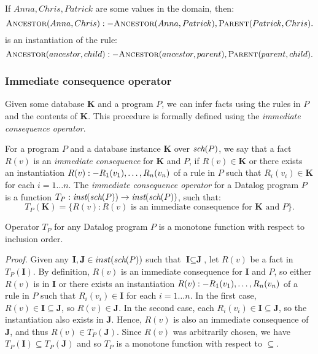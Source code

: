 \begin{exmp}
If $Anna, Chris, Patrick$ are some values in the domain, then:
$$\textsc{Ancestor}(Anna, Chris) :- \textsc{Ancestor} (Anna, Patrick), \textsc{Parent} (Patrick, Chris).$$
is an instantiation of the rule: 
$$\textsc{Ancestor} (ancestor, child) :- \textsc{Ancestor} (ancestor, parent), \textsc{Parent} (parent, child).$$
\end{exmp}

\subsubsection{Immediate consequence operator}
Given some database $\textbf{K}$ and a program $P$, we can infer facts using the rules in $P$ and the contents of $\textbf{K}$. This procedure is formally defined using the \emph{immediate consequence operator}.

\begin{defn}

For a program $P$ and a database instance $\textbf{K}$ over $\textit{sch}(P)$, we say that a fact $R(v)$ is an \emph{immediate consequence} for $\textbf{K}$ and $P$, if $R(v) \in \textbf{K}$ or there exists an instantiation $R(v) :- R_1(v_1), \dots, R_n(v_n)$ of a rule in $P$ such that $R_i(v_i) \in \textbf{K}$ for each $i = 1\dots n$. The \emph{immediate consequence operator} for a Datalog program $P$ is a function $T_P: \textit{inst}(\textit{sch}(P)) \to \textit{inst}(\textit{sch}(P))$, such that:
$$T_P(\textbf{K}) = \{ R(v): R(v) \text{ is an immediate consequence for } \textbf{K} \text{ and } P \}.$$

\end{defn}

\begin{lem}
Operator $T_P$ for any Datalog program $P$ is a monotone function with respect to inclusion order.
\end{lem}
\emph{Proof.} Given any $\textbf{I}, \textbf{J} \in inst(\textit{sch}(P))$ such that $\textbf{I} \subseteq \textbf{J}$, let $R(v)$ be a fact in $T_P(\textbf{I})$.
By definition, $R(v)$ is an immediate consequence for $\textbf{I}$ and $P$, so either $R(v)$ is in $\textbf{I}$ or there exists an instantiation
 $R(v) :- R_1(v_1), \dots, R_n(v_n)$ of a rule in $P$ such that $R_i(v_i) \in \textbf{I}$ for each $i = 1\dots n$. 
In the first case, $R(v) \in \textbf{I} \subseteq \textbf{J}$, so $R(v) \in \textbf{J}$. 
In the second case, each $R_i(v_i) \in \textbf{I} \subseteq \textbf{J}$, so the instantiation also exists in $\textbf{J}$. 
Hence, $R(v)$ is also an immediate consequence of $\textbf{J}$, and thus $R(v) \in T_P(\textbf{J})$. 
Since $R(v)$ was arbitrarily chosen, we have  $T_P(\textbf{I}) \subseteq T_P(\textbf{J})$ and so $T_P$ is a monotone function with respect to $\subseteq$.

